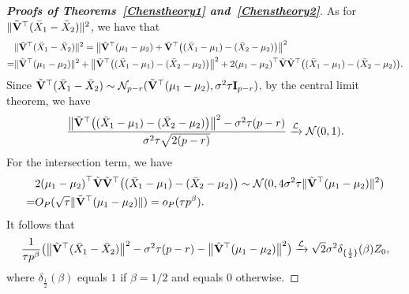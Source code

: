 \documentclass[times,sort&compress,3p]{elsarticle}
\theoremstyle{plain}
\theoremstyle{definition}
\theoremstyle{remark}
\begin{document}
\begin{appendices}
\begin{proof}[\textbf{Proofs of Theorems~\ref{Chenstheory1} and~\ref{Chenstheory2}}]
    As for $\|\tilde{\mathbf{V}}^\top (\bar{X}_1-\bar{X}_2)\|^2$, we have that
        $$
        \begin{aligned}
            &\|\tilde{\mathbf{V}}^\top (\bar{X}_1-\bar{X}_2)\|^2
            =\big\|\tilde{\mathbf{V}}^\top (\mu_1-\mu_2)+\tilde{\mathbf{V}}^\top \big((\bar{X}_1-\mu_1)-(\bar{X}_2-\mu_2)\big)\big\|^2\\
            =&\|\tilde{\mathbf{V}}^\top (\mu_1-\mu_2)\|^2+
            \big\|\tilde{\mathbf{V}}^\top \big((\bar{X}_1-\mu_1)-(\bar{X}_2-\mu_2)\big)\big\|^2+
            2{(\mu_1-\mu_2)}^\top \tilde{\mathbf{V}}\tilde{\mathbf{V}}^\top \big((\bar{X}_1-\mu_1)-(\bar{X}_2-\mu_2)\big).
        \end{aligned}
        $$
Since $\tilde{\mathbf{V}}^\top  (\bar{X}_1-\bar{X}_2)\sim \mathcal{N}_{p-r}(\tilde{\mathbf{V}}^\top  (\mu_1-\mu_2),  \sigma^2 \tau \mathbf{I}_{p-r})$, by the central limit theorem, we have
    $$
\frac{
    \big\|\tilde{\mathbf{V}}^\top \big((\bar{X}_1-\mu_1)-(\bar{X}_2-\mu_2)\big)\big\|^2-\sigma^2 \tau (p-r)}{\sigma^2 \tau\sqrt{2(p-r)}}\xrightarrow{\mathcal{L}} \mathcal{N}(0,1).
    $$
    For the intersection term, we have
    \begin{equation*}
        \begin{aligned}
            &2{(\mu_1-\mu_2)}^\top \tilde{\mathbf{V}}\tilde{\mathbf{V}}^\top \big((\bar{X}_1-\mu_1)-(\bar{X}_2-\mu_2)\big)
            \sim \mathcal{N}(0,4\sigma^2 \tau \|\tilde{\mathbf{V}}^\top (\mu_1-\mu_2)\|^2)\\
            =& O_P(\sqrt{\tau}\|\tilde{\mathbf{V}}^\top (\mu_1-\mu_2)\| )=o_P(\tau p^{\beta}).
        \end{aligned}
    \end{equation*}
    It follows that
    \begin{equation}\label{eq:kkk3}
\frac{1}{\tau p^\beta}
    \big(\big\|\tilde{\mathbf{V}}^\top (\bar{X}_1-\bar{X}_2)\big\|^2-\sigma^2 \tau (p-r)-\big\|\tilde{\mathbf{V}}^\top (\mu_1-\mu_2)\big\|^2\big)
    \xrightarrow{\mathcal{L}} 
        \sqrt{2}\sigma^2 \delta_{\{\frac{1}{2}\}}(\beta)Z_0,
    \end{equation}
    where $\delta_{\frac{1}{2}}(\beta)$ equals $1$ if $\beta=1/2$ and equals $0$ otherwise.



\end{proof}
\end{appendices}
\end{document}
